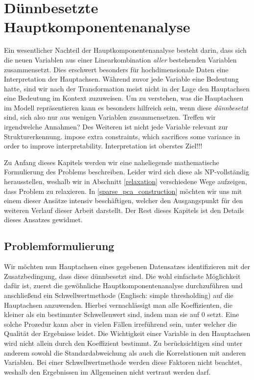 \chapter{Dünnbesetzte Hauptkomponentenanalyse}

\label{sparse_pca}

Ein wesentlicher Nachteil der Hauptkomponentenanalyse besteht darin, dass sich die neuen Variablen aus einer Linearkombination \textit{aller} bestehenden Variablen zusammensetzt. Dies erschwert besonders für hochdimensionale Daten eine Interpretation der Hauptachsen. Während zuvor jede Variable eine Bedeutung hatte, sind wir nach der Transformation meist nicht in der Lage den Hauptachsen eine Bedeutung im Kontext zuzuweisen. Um zu verstehen, was die Hauptachsen im Modell repräsentieren kann es besonders hilfreich sein, wenn diese \textit{dünnbesetzt} sind, sich also nur aus wenigen Variablen zusammensetzen. Treffen wir irgendwelche Annahmen? Des Weiteren ist nicht jede Variable relevant zur Strukturerkennung. impose extra constraints, which sacrifices some variance in order to improve interpretability. Interpretation ist oberstes Ziel!!!

Zu Anfang dieses Kapitels werden wir eine naheliegende mathematische Formulierung des Problems beschreiben. Leider wird sich diese als NP-vollständig herausstellen, weshalb wir in Abschnitt \ref{relaxation} verschiedene Wege aufzeigen, dass Problem zu relaxieren. In \ref{sparse_pca_construction} möchten wir uns mit einem dieser Ansätze intensiv beschäftigen, welcher den Ausgangspunkt für den weiteren Verlauf dieser Arbeit darstellt. Der Rest dieses Kapitels ist den Details dieses Ansatzes gewidmet.

\section{Problemformulierung}
\label{problem_formulation}

Wir möchten nun Hauptachsen eines gegebenen Datensatzes identifizieren mit der Zusatzbedingung, dass diese dünnbesetzt sind. Die wohl einfachste Möglichkeit dafür ist, zuerst die gewöhnliche Hauptkomponentenanalyse durchzuführen und anschließend ein Schwellwertmethode (Englisch: simple thresholding) auf die Hauptachsen anzuwenden. Hierbei vernachlässigt man alle Koeffizienten, die kleiner als ein bestimmter Schwellenwert sind, indem man sie auf 0 setzt. Eine solche Prozedur kann aber in vielen Fällen irreführend sein, unter welcher die Qualität der Ergebnisse leidet. \cite{cadima} Die Wichtigkeit einer Variable in den Hauptachsen wird nicht allein durch den Koeffizient bestimmt. Zu berücksichtigen sind unter anderem sowohl die Standardabweichung als auch die Korrelationen mit anderen Variablen. Bei einer Schwellwertmethode werden diese Faktoren nicht beachtet, weshalb den Ergebnissen im Allgemeinen nicht vertraut werden darf.

